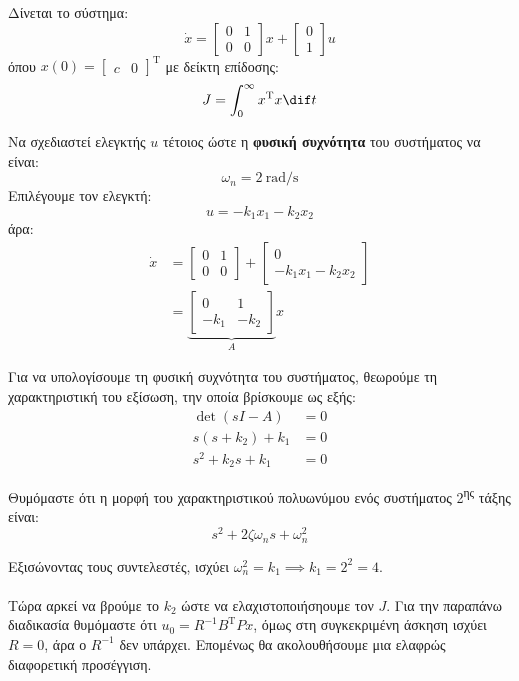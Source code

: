 \documentclass[11pt,a4paper,notitlepage,fleqn]{article}
\begin{document}

\begin{exercise}
	Δίνεται το σύστημα:
	\[
	\dot x = \left[\begin{matrix}
	0 & 1 \\ 0 & 0
	\end{matrix}\right]x + \left[\begin{matrix}
	0 \\ 1
	\end{matrix}\right]u
	\]
	όπου \( x(0) = \left[\begin{matrix}
	c & 0
	\end{matrix}\right]^{\mathrm{T}} \)
	με δείκτη επίδοσης:
	\[
	J = \int_{0}^{\infty} x^{\mathrm T}x\dif t
	\]

	Να σχεδιαστεί ελεγκτής \( u \) τέτοιος ώστε η \textbf{φυσική συχνότητα} του συστήματος να είναι:
	\[
	\omega_n = 2 \ \mathrm{rad/s}
	\]
	\tcblower
	Επιλέγουμε τον ελεγκτή:
	\[
	u = -k_1x_1 - k_2x_2
	\]
	άρα:
	\begin{align*}
		\dot x &= \left[\begin{matrix}
		0 & 1 \\ 0 & 0
		\end{matrix}\right] + \left[\begin{matrix}
		0 \\ -k_1x_1 - k_2x_2
		\end{matrix}\right]
		\\ &= \underbrace{\left[\begin{matrix}
		0 & 1 \\ -k_1 & -k_2
		\end{matrix}\right]}_{A}x
	\end{align*}

	Για να υπολογίσουμε τη φυσική συχνότητα του συστήματος, θεωρούμε τη χαρακτηριστική του εξίσωση, την
	οποία βρίσκουμε ως εξής:
	\begin{align*}
		\det(sI-A) &= 0\\
		s(s+k_2) + k_1 &= 0\\
		s^2 + k_2s + k_1 &= 0
	\end{align*}

	Θυμόμαστε ότι η μορφή του χαρακτηριστικού πολυωνύμου ενός συστήματος
	2\textsuperscript{ης} τάξης είναι:
	\[
	s^2 + 2ζ\omega_ns + \omega_n^2
	\]

	Εξισώνοντας τους συντελεστές, ισχύει \( \omega_n^2 = k_1 \implies
	k_1 = 2^2 = 4 \).

	\paragraph{}
	Τώρα αρκεί να βρούμε το \( k_2 \) ώστε να ελαχιστοποιήσηουμε
	τον \( J \). Για την παραπάνω διαδικασία θυμόμαστε ότι \( u_0
	= R^{-1}B^{\mathrm T}Px \), όμως στη συγκεκριμένη άσκηση
	ισχύει \( R=0 \), άρα ο \( R^{-1} \) δεν υπάρχει. Επομένως θα
	ακολουθήσουμε μια ελαφρώς διαφορετική προσέγγιση.


\end{exercise}
\end{document}
